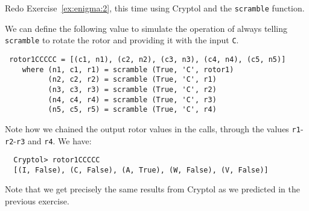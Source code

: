 \begin{Exercise}\label{ex:enigma:3}
  Redo Exercise~\ref{ex:enigma:2}, this time using Cryptol and the
  {\tt scramble} function.
\end{Exercise}
\begin{Answer}
  We can define the following value to simulate the operation of
  always telling {\tt scramble} to rotate the rotor and providing it
  with the input {\tt C}.
\begin{Verbatim}
 rotor1CCCCC = [(c1, n1), (c2, n2), (c3, n3), (c4, n4), (c5, n5)]
    where (n1, c1, r1) = scramble (True, 'C', rotor1)
          (n2, c2, r2) = scramble (True, 'C', r1)
          (n3, c3, r3) = scramble (True, 'C', r2)
          (n4, c4, r4) = scramble (True, 'C', r3)
          (n5, c5, r5) = scramble (True, 'C', r4)
\end{Verbatim}
  Note how we chained the output rotor values in the calls,
through the values {\tt r1}-{\tt r2}-{\tt r3} and {\tt r4}. We have:
\begin{Verbatim}
  Cryptol> rotor1CCCCC
  [(I, False), (C, False), (A, True), (W, False), (V, False)]
\end{Verbatim}
Note that we get precisely the same results from Cryptol as we
predicted in the previous exercise.
\end{Answer}


